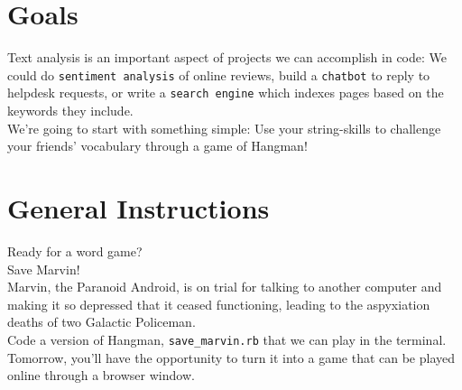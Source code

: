 \documentclass{42-en}
\begin{document}

\chapter{Goals}

Text analysis is an important aspect of projects we can accomplish in code: We could do \texttt{sentiment analysis} of online reviews, build a \texttt{chatbot} to reply to helpdesk requests, or write a \texttt{search engine} which indexes pages based on the keywords they include.\\

We're going to start with something simple: Use your string-skills to challenge your friends' vocabulary through a game of Hangman!


\chapter{General Instructions}

Ready for a word game?\\

Save Marvin!\\

Marvin, the Paranoid Android, is on trial for talking to another computer and making it so depressed that it ceased functioning, leading to the aspyxiation deaths of two Galactic Policeman.\\

Code a version of Hangman, \texttt{save\_marvin.rb} that we can play in the terminal. Tomorrow, you'll have the opportunity to turn it into a game that can be played online through a browser window.\\
\end{document}
